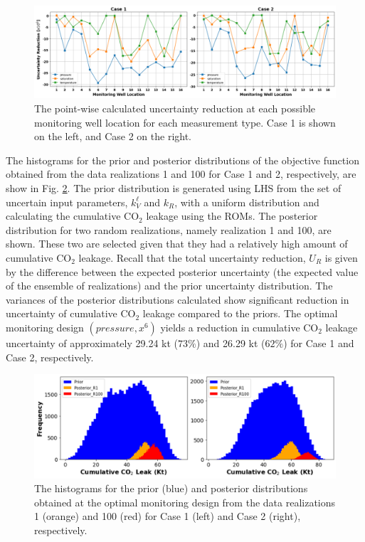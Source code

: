 \documentclass[a4paper,fleqn]{cas-sc}
\begin{document}
\begin{figure}
    \centering
    \includegraphics[width=16cm]{figs/Figure 11.pdf}
    \caption{The point-wise calculated uncertainty reduction at each possible monitoring well location for each measurement type. Case 1 is shown on the left, and Case 2 on the right.}
    \label{point_ur}
\end{figure}

The histograms for the prior and posterior distributions of the objective function obtained from the data realizations 1 and 100 for Case 1 and 2, respectively, are show in Fig. \ref{ur_dist}. The prior distribution is generated using LHS from the set of uncertain input parameters, $k_V^\ell$ and $k_R$, with a uniform distribution and calculating the cumulative CO$_2$ leakage using the ROMs. The posterior distribution for two random realizations, namely realization 1 and 100, are shown. These two are selected given that they had a relatively high amount of cumulative CO$_2$ leakage. Recall that the total uncertainty reduction, $U_R$ is given by the difference between the expected posterior uncertainty (the expected value of the ensemble of realizations) and the prior uncertainty distribution. The variances of the posterior distributions calculated show significant reduction in uncertainty of cumulative CO$_2$ leakage compared to the priors. The optimal monitoring design $(pressure, x^6)$ yields a reduction in cumulative CO$_2$ leakage uncertainty of approximately 29.24 kt ($73\%$) and 26.29 kt ($62\%$) for Case 1 and Case 2, respectively. 

\begin{figure}
    \centering
    \includegraphics[width=16cm]{figs/Figure 12.pdf}
    \caption{The histograms for the prior (blue) and posterior distributions obtained at the optimal monitoring design from the data realizations 1 (orange) and 100 (red) for Case 1 (left) and Case 2 (right), respectively.}
    \label{ur_dist}
\end{figure}
\end{document}
